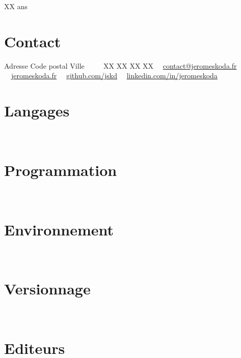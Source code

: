 \documentclass[]{friggeri-cv-custom} %
\begin{document}
\begin{aside}
  XX ans
  \section{Contact}
  Adresse
  Code postal Ville
  ~~
  {\Large\faMobilePhone}~~XX XX XX XX
  \faEnvelopeO~~\href{mailto:contact@jeromeskoda.fr}{contact@jeromeskoda.fr}
  \faGlobe~~\href{https://www.jeromeskoda.fr}{jeromeskoda.fr}
  \faGithub~~\href{https://www.github.com/jskd}{github.com/jskd}
  \faLinkedin~~\href{https://www.linkedin.com/in/jeromeskoda}{linkedin.com/in/jeromeskoda}
  \section{Langages}
  ~\textbullet~~\textbullet~
  ~\textbullet~
  ~\textbullet~~\textbullet~~\textbullet~\expmed{\Csharp}
  ~\textbullet~~\textbullet~
  ~\textbullet~~\textbullet~
  ~\textbullet~~\textbullet~\expmed{\LaTeX}
  \section{Programmation}
  ~\textbullet~
  ~\textbullet~
  \section{Environnement}
  ~\textbullet~~\textbullet~
  ~\textbullet~
  ~\textbullet~
  \section{Versionnage}
  ~\textbullet~~\textbullet~
  \section{Editeurs}
  ~\textbullet~
  ~\textbullet~~\textbullet~
  ~\textbullet~

\end{aside}
\end{document}
